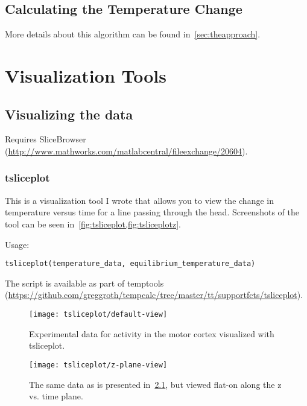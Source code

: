 \section{Calculating the Temperature Change}
More details about this algorithm can be found in~\cref{sec:theapproach}.

\chapter{Visualization Tools}
\label{ch:visualize}
\section{Visualizing the data}
Requires SliceBrowser (\url{http://www.mathworks.com/matlabcentral/fileexchange/20604}).
% 
\clearpage
\subsection{tsliceplot}
This is a visualization tool I wrote that allows you to view the change in temperature versus time for a line passing through the head.  Screenshots of the tool can be seen in~\cref{fig:tsliceplot,fig:tsliceplotz}.

Usage:
\begin{lstlisting}[style=snippet,label=invoke-tsliceplot]
  tsliceplot(temperature_data, equilibrium_temperature_data)
\end{lstlisting}

The script is available as part of temptools (\url{https://github.com/greggroth/tempcalc/tree/master/tt/supportfcts/tsliceplot}).

\FloatBarrier
\begin{figure}[t]
  \centering
    \caption[Visualization using tsliceplot]{Experimental data for activity in the motor cortex visualized with tsliceplot. \label{fig:tsliceplot}}
    \texttt{[image: tsliceplot/default-view]}
  \centering
\end{figure}

\begin{figure}[b]
  \centering
    \caption[Visualization using tsliceplot (z v. t plane)]{The same data as is presented in~\cref{fig:tsliceplot}, but viewed flat-on along the z vs. time plane.\label{fig:tsliceplotz}}
    \texttt{[image: tsliceplot/z-plane-view]}
  \centering
\end{figure}
\FloatBarrier
